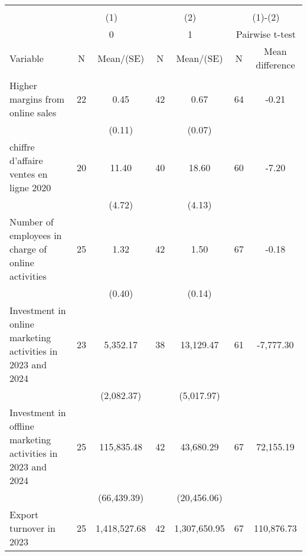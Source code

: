 
\begin{tabular}{@{\extracolsep{5pt}}lcccccc}
\\[-1.8ex]\hline \hline \\[-1.8ex]
 & \multicolumn{2}{c}{(1)}  & \multicolumn{2}{c}{(2)}  & \multicolumn{2}{c}{(1)-(2)} \\
 & \multicolumn{2}{c}{0}  & \multicolumn{2}{c}{1}  & \multicolumn{2}{c}{Pairwise t-test}  \\
Variable & N & Mean/(SE) & N & Mean/(SE) & N & Mean difference \\ \hline \\[-1.8ex] 
Higher margins from online sales   & 22    & 0.45    & 42    & 0.67    & 64    & -0.21   \\
 &   & (0.11)  &   & (0.07)  &   &  \\ [1ex]
chiffre d'affaire ventes en ligne 2020   & 20    & 11.40    & 40    & 18.60    & 60    & -7.20   \\
 &   & (4.72)  &   & (4.13)  &   &  \\ [1ex]
Number of employees in charge of online activities   & 25    & 1.32    & 42    & 1.50    & 67    & -0.18   \\
 &   & (0.40)  &   & (0.14)  &   &  \\ [1ex]
Investment in online marketing activities in 2023 and 2024   & 23    & 5,352.17    & 38    & 13,129.47    & 61    & -7,777.30   \\
 &   & (2,082.37)  &   & (5,017.97)  &   &  \\ [1ex]
Investment in offline marketing activities in 2023 and 2024   & 25    & 115,835.48    & 42    & 43,680.29    & 67    & 72,155.19   \\
 &   & (66,439.39)  &   & (20,456.06)  &   &  \\ [1ex]
Export turnover in 2023   & 25    & 1,418,527.68    & 42    & 1,307,650.95    & 67    & 110,876.73   \\

\end{tabular}
